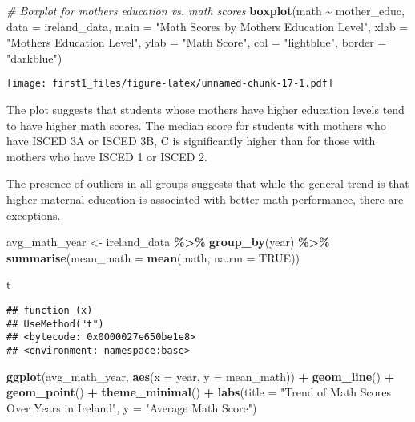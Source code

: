 \documentclass[
]{article}
\newenvironment{Shaded}{\begin{snugshade}}{\end{snugshade}}
\newcommand{\AttributeTok}[1]{\textcolor[rgb]{0.13,0.29,0.53}{#1}}
\newcommand{\CommentTok}[1]{\textcolor[rgb]{0.56,0.35,0.01}{\textit{#1}}}
\newcommand{\ConstantTok}[1]{\textcolor[rgb]{0.56,0.35,0.01}{#1}}
\newcommand{\FunctionTok}[1]{\textcolor[rgb]{0.13,0.29,0.53}{\textbf{#1}}}
\newcommand{\NormalTok}[1]{#1}
\newcommand{\OtherTok}[1]{\textcolor[rgb]{0.56,0.35,0.01}{#1}}
\newcommand{\SpecialCharTok}[1]{\textcolor[rgb]{0.81,0.36,0.00}{\textbf{#1}}}
\newcommand{\StringTok}[1]{\textcolor[rgb]{0.31,0.60,0.02}{#1}}
\begin{document}
\begin{Shaded}
\begin{Highlighting}[]
\CommentTok{\# Boxplot for mother\textquotesingle{}s education vs. math scores}
\FunctionTok{boxplot}\NormalTok{(math }\SpecialCharTok{\textasciitilde{}}\NormalTok{ mother\_educ, }\AttributeTok{data =}\NormalTok{ ireland\_data, }
        \AttributeTok{main =} \StringTok{"Math Scores by Mother\textquotesingle{}s Education Level"}\NormalTok{,}
        \AttributeTok{xlab =} \StringTok{"Mother\textquotesingle{}s Education Level"}\NormalTok{, }\AttributeTok{ylab =} \StringTok{"Math Score"}\NormalTok{,}
        \AttributeTok{col =} \StringTok{"lightblue"}\NormalTok{, }\AttributeTok{border =} \StringTok{"darkblue"}\NormalTok{)}
\end{Highlighting}
\end{Shaded}

\texttt{[image: first1\_files/figure-latex/unnamed-chunk-17-1.pdf]}

The plot suggests that students whose mothers have higher education
levels tend to have higher math scores. The median score for students
with mothers who have ISCED 3A or ISCED 3B, C is significantly higher
than for those with mothers who have ISCED 1 or ISCED 2.

The presence of outliers in all groups suggests that while the general
trend is that higher maternal education is associated with better math
performance, there are exceptions.

\begin{Shaded}
\begin{Highlighting}[]
\NormalTok{avg\_math\_year }\OtherTok{\textless{}{-}}\NormalTok{ ireland\_data }\SpecialCharTok{\%\textgreater{}\%}
  \FunctionTok{group\_by}\NormalTok{(year) }\SpecialCharTok{\%\textgreater{}\%}
  \FunctionTok{summarise}\NormalTok{(}\AttributeTok{mean\_math =} \FunctionTok{mean}\NormalTok{(math, }\AttributeTok{na.rm =} \ConstantTok{TRUE}\NormalTok{))}

\NormalTok{t}
\end{Highlighting}
\end{Shaded}

\begin{verbatim}
## function (x) 
## UseMethod("t")
## <bytecode: 0x0000027e650be1e8>
## <environment: namespace:base>
\end{verbatim}

\begin{Shaded}
\begin{Highlighting}[]
\FunctionTok{ggplot}\NormalTok{(avg\_math\_year, }\FunctionTok{aes}\NormalTok{(}\AttributeTok{x =}\NormalTok{ year, }\AttributeTok{y =}\NormalTok{ mean\_math)) }\SpecialCharTok{+}
  \FunctionTok{geom\_line}\NormalTok{() }\SpecialCharTok{+}
  \FunctionTok{geom\_point}\NormalTok{() }\SpecialCharTok{+}
  \FunctionTok{theme\_minimal}\NormalTok{() }\SpecialCharTok{+}
  \FunctionTok{labs}\NormalTok{(}\AttributeTok{title =} \StringTok{"Trend of Math Scores Over Years in Ireland"}\NormalTok{, }\AttributeTok{y =} \StringTok{"Average Math Score"}\NormalTok{)}
\end{Highlighting}
\end{Shaded}
\end{document}
